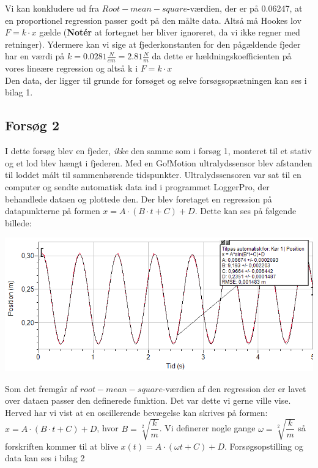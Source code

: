 Vi kan konkludere ud fra $Root-mean-square$-værdien, der er på 0.06247, at en proportionel regression passer godt på den målte data. Altså må Hookes lov $F=k \cdot x$ gælde (\textbf{Notér} at fortegnet her bliver ignoreret, da vi ikke regner med retninger). Ydermere kan vi sige at fjederkonstanten for den pågældende fjeder har en værdi på $k=0.0281\frac{N}{cm} = 2.81 \frac{N}{m}$ da dette er hældningskoefficienten på vores lineære regression og altså k i $F=k \cdot x$
\\

Den data, der ligger til grunde for forsøget og selve forsøgsopsætningen kan ses i bilag 1. 
\\

\subsection{Forsøg 2}
I dette forsøg blev en fjeder, \emph{ikke} den samme som i forsøg 1, monteret til et stativ og et lod blev hængt i fjederen. Med en Go!Motion ultralydssensor blev afstanden til loddet målt til sammenhørende tidspunkter. Ultralydssensoren var sat til en computer og sendte automatisk data ind i programmet LoggerPro, der behandlede dataen og plottede den. Der blev foretaget en regression på datapunkterne på formen $x = A \cdot (B \cdot t + C) + D$. Dette kan ses på følgende billede: 
\begin{center}
\includegraphics[scale=0.7]{Billeder/graf2}
\end{center}

Som det fremgår af $root-mean-square$-værdien af den regression der er lavet over dataen passer den definerede funktion. Det var dette vi gerne ville vise. Herved har vi vist at en oscillerende bevægelse kan skrives på formen: $x = A \cdot (B \cdot t + C) + D$, hvor $B=\sqrt[2]{\dfrac{k}{m}}$. Vi definerer nogle gange $\omega = \sqrt[2]{\dfrac{k}{m}}$ så forskriften kommer til at blive $x(t) = A \cdot (\omega t + C) + D$. Forsøgsopstilling og data kan ses i bilag 2
\\

